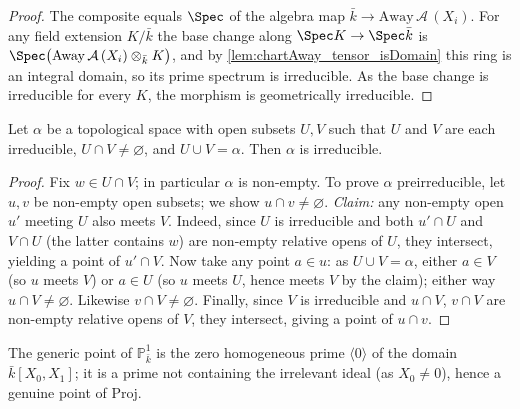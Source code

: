 \begin{proof}\leanok
  The composite equals \(\Spec\) of the algebra map
  \(\bar k \to \mathrm{Away}\,\mathcal A\,(X_i)\). For any field extension \(K/\bar k\) the base
  change along \(\Spec K \to \Spec \bar k\) is
  \(\Spec\bigl(\mathrm{Away}\,\mathcal A\,(X_i) \otimes_{\bar k} K\bigr)\), and by
  \cref{lem:chartAway_tensor_isDomain} this ring is an integral domain, so its prime spectrum is
  irreducible. As the base change is irreducible for every \(K\), the morphism is geometrically
  irreducible.
\end{proof}
\begin{lemma}
  \label{lem:irreducibleSpace_of_two_irreducible_opens}
  Let \(\alpha\) be a topological space with open subsets \(U, V\) such that \(U\) and \(V\) are
  each irreducible, \(U \cap V \neq \varnothing\), and \(U \cup V = \alpha\). Then \(\alpha\) is
  irreducible.
\end{lemma}
\begin{proof}\leanok
  Fix \(w \in U \cap V\); in particular \(\alpha\) is non-empty. To prove \(\alpha\)
  preirreducible, let \(u, v\) be non-empty open subsets; we show \(u \cap v \neq \varnothing\).
  \emph{Claim:} any non-empty open \(u'\) meeting \(U\) also meets \(V\). Indeed, since \(U\) is
  irreducible and both \(u' \cap U\) and \(V \cap U\) (the latter contains \(w\)) are non-empty
  relative opens of \(U\), they intersect, yielding a point of \(u' \cap V\). Now take any point
  \(a \in u\): as \(U \cup V = \alpha\), either \(a \in V\) (so \(u\) meets \(V\)) or \(a \in U\)
  (so \(u\) meets \(U\), hence meets \(V\) by the claim); either way \(u \cap V \neq \varnothing\).
  Likewise \(v \cap V \neq \varnothing\). Finally, since \(V\) is irreducible and \(u \cap V\),
  \(v \cap V\) are non-empty relative opens of \(V\), they intersect, giving a point of
  \(u \cap v\).
\end{proof}
\begin{definition}
  \label{def:projectiveLineBarGenericPt}
  The generic point of \(\mathbb P^1_{\bar k}\) is the zero homogeneous prime \(\langle 0 \rangle\)
  of the domain \(\bar k[X_0, X_1]\); it is a prime not containing the irrelevant ideal (as
  \(X_0 \neq 0\)), hence a genuine point of \(\mathrm{Proj}\).
\end{definition}
